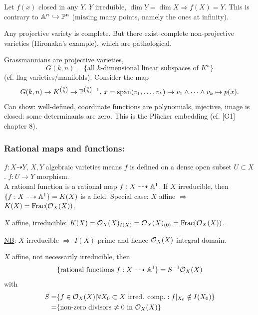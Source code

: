 \documentclass[a4paper,11pt]{article}
\begin{document}
{			Let $f(x)$ closed in any $Y$. $Y$ irreduible, $\dim Y=\dim X\Longrightarrow f(X)=Y$. This is contrary to $\AA^n\hookrightarrow\P^n$ (missing many points, namely the ones at infinity).

			\begin{remark}
				Any projective variety is complete. But there exist complete non-projective varieties (Hironaka's example), which are pathological.
			\end{remark}

			\begin{eg}
				Grassmannians are projective varieties,
				\begin{equation*}
					G(k,n)=\{\text{all $k$-dimensional linear subspaces of $K^n$}\}	
				\end{equation*}
				(cf. flag varieties/manifolds). Consider the map
				\begin{equation*}
					G(k,n)\rightarrow K^{\binom{n}{k}}\rightarrow \P^{\binom{n}{k}-1},\, x=\spa(v_1,\dots,v_k)\mapsto v_1\wedge\dots\wedge v_k\mapsto p(x).
				\end{equation*}
				Can show: well-defined, coordinate functions are polynomials, injective, image is closed: some determinants are zero. This is the Plücker embedding (cf. [G1] chapter 8).
			\end{eg}

			\subsubsection*{Rational maps and functions:}

			$f:X\dashrightarrow Y$, $X,Y$ algebraic varieties means $f$ is defined on a dense open subset $U\subset X$. $f:U\rightarrow Y$ morphism.\\

			\noindent A rational function is a rational map $f:X\dashrightarrow\AA^1$. If $X$ irreducible, then $\{f:X\dashrightarrow\AA^1\}=K(X)$ is a field. Special case: $X$ affine $\Longrightarrow$ $K(X)=\Frac(\O_X(X))$.

			\begin{remark}
				$X$ affine, irreducible: $K(X)=\O_X(X)_{I(X)}=\O_X(X)_{(0)}=\Frac(\O_X(X))$.
			\end{remark}

			\noindent\underline{NB}: $X$ irreducible $\Longrightarrow$ $I(X)$ prime and hence $\O_X(X)$ integral domain.

			\begin{remark}
				$X$ affine, not necessarily irreducible, then 
				\begin{equation*}
					\{\text{rational functions $f:X\dashrightarrow\AA^1$}\}=S^{-1}\O_X(X)
				\end{equation*}
				with 
				\begin{align*}
					S=&\{f\in\O_X(X)|\forall X_0\subset X\text{ irred. comp.}:f|_{X_0}\notin I(X_0)\}\\
					=&\{\text{non-zero divisors $\neq0$ in $\O_X(X)$}\}
				\end{align*}
			\end{remark}

}
\end{document}
